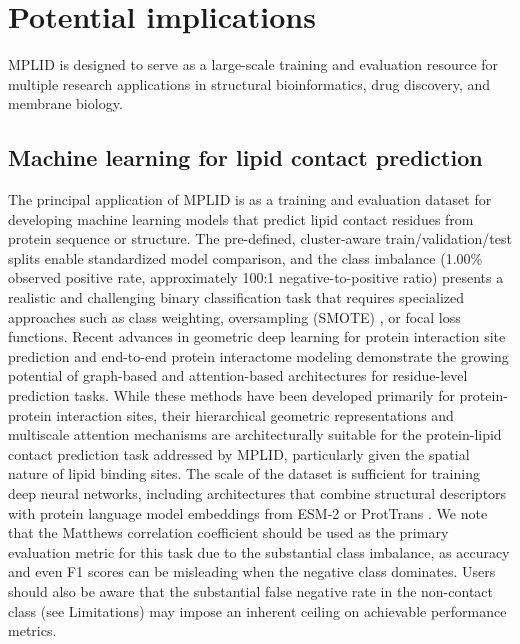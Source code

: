 \documentclass[unnumsec,webpdf,contemporary,large]{oup-authoring-template}
\begin{document}
\section{Potential implications}

MPLID is designed to serve as a large-scale training and evaluation resource for multiple research applications in structural bioinformatics, drug discovery, and membrane biology.

\subsection{Machine learning for lipid contact prediction}

The principal application of MPLID is as a training and evaluation dataset for developing machine learning models that predict lipid contact residues from protein sequence or structure. The pre-defined, cluster-aware train/validation/test splits enable standardized model comparison, and the class imbalance (1.00\% observed positive rate, approximately 100:1 negative-to-positive ratio) presents a realistic and challenging binary classification task that requires specialized approaches such as class weighting, oversampling (SMOTE) \cite{chawla2002}, or focal loss functions. Recent advances in geometric deep learning for protein interaction site prediction \cite{han2025, zhang2024gigascience} and end-to-end protein interactome modeling \cite{chen2025} demonstrate the growing potential of graph-based and attention-based architectures for residue-level prediction tasks. While these methods have been developed primarily for protein-protein interaction sites, their hierarchical geometric representations and multiscale attention mechanisms are architecturally suitable for the protein-lipid contact prediction task addressed by MPLID, particularly given the spatial nature of lipid binding sites. The scale of the dataset is sufficient for training deep neural networks, including architectures that combine structural descriptors with protein language model embeddings from ESM-2 \cite{lin2023} or ProtTrans \cite{elnaggar2022}. We note that the Matthews correlation coefficient should be used as the primary evaluation metric for this task due to the substantial class imbalance, as accuracy and even F1 scores can be misleading when the negative class dominates. Users should also be aware that the substantial false negative rate in the non-contact class (see Limitations) may impose an inherent ceiling on achievable performance metrics.
\end{document}
